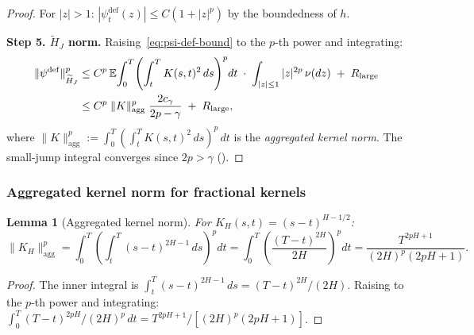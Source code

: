\documentclass[11pt,a4paper]{article}
\theoremstyle{plain}
\newtheorem{lemma}[theorem]{Lemma}
\theoremstyle{definition}
\theoremstyle{remark}
\newcommand{\E}{\mathbb{E}}
\begin{document}
\begin{proof}
For $|z| > 1$: $|\psi_t^{\mathrm{def}}(z)| \leq
C(1 + |z|^p)$ by the boundedness of $h$.

\textbf{Step 5.  $\widetilde{H}_J$ norm.}
Raising~\eqref{eq:psi-def-bound} to the $p$-th power and
integrating:
\begin{align}
  \|\psi^{\mathrm{def}}\|_{\widetilde{H}_J}^p
  &\leq C^p\,\E\!\int_0^T\!\left(\int_t^T K(s,t)^2\,ds
  \right)^p\!dt\;\cdot\;\int_{|z|\leq 1}|z|^{2p}\,\nu(dz)
  \;+\;R_{\mathrm{large}}
  \notag\\
  &\leq C^p\;\|K\|_{\mathrm{agg}}^p\;
  \frac{2c_\gamma}{2p-\gamma}
  \;+\;R_{\mathrm{large}},
  \label{eq:psi-def-norm}
\end{align}
where $\|K\|_{\mathrm{agg}}^p := \int_0^T (\int_t^T
K(s,t)^2\,ds)^p\,dt$ is the \emph{aggregated kernel norm}.
The small-jump integral converges since $2p > \gamma$
().
\end{proof}


\subsubsection{Aggregated kernel norm for fractional kernels}

\begin{lemma}[Aggregated kernel norm]\label{lem:agg-kernel}
For $K_H(s,t) = (s-t)^{H-1/2}$:
\begin{equation}\label{eq:agg-norm}
  \|K_H\|_{\mathrm{agg}}^p
  = \int_0^T\!\left(\int_t^T (s-t)^{2H-1}\,ds\right)^p dt
  = \int_0^T\!\left(\frac{(T-t)^{2H}}{2H}\right)^p dt
  = \frac{T^{2pH+1}}{(2H)^p(2pH+1)}.
\end{equation}
\end{lemma}

\begin{proof}
The inner integral is $\int_t^T(s-t)^{2H-1}\,ds =
(T-t)^{2H}/(2H)$.  Raising to the $p$-th power and
integrating: $\int_0^T(T-t)^{2pH}/(2H)^p\,dt =
T^{2pH+1}/[(2H)^p(2pH+1)]$.
\end{proof}
\end{document}
